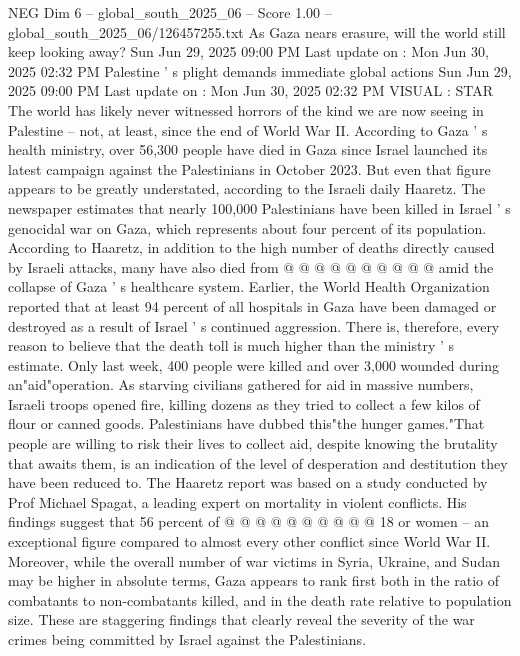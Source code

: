 \begin{textsample}{NEG Dim 6 – global\_south\_2025\_06 – Score 1.00 – global\_south\_2025\_06/126457255.txt}  \label{ex:f6_neg_442}
As Gaza nears erasure, will the world still keep looking away?
Sun Jun 29, 2025 09:00 PM Last update on : Mon Jun 30, 2025 02:32 PM Palestine ' s plight demands immediate global actions Sun Jun 29, 2025 09:00 PM Last update on : Mon Jun 30, 2025 02:32 PM VISUAL : STAR The world has likely never witnessed horrors of the kind we are now seeing in Palestine -- not, at least, since the end of World War II.
According to Gaza ' s health ministry, over 56,300 people have died in Gaza since Israel launched its latest campaign against the Palestinians in October 2023.
But even that figure appears to be greatly understated, according to the Israeli daily Haaretz.
The newspaper estimates that nearly 100,000 Palestinians have been killed in Israel ' s genocidal war on Gaza, which represents about four percent of its population.
According to Haaretz, in addition to the high number of deaths directly caused by Israeli attacks, many have also died from @ @ @ @ @ @ @ @ @ @ amid the collapse of Gaza ' s healthcare system.
Earlier, the World Health Organization reported that at least 94 percent of all hospitals in Gaza have been damaged or destroyed as a result of Israel ' s continued aggression.
There is, therefore, every reason to believe that the death toll is much higher than the ministry ' s estimate.
Only last week, 400 people were killed and over 3,000 wounded during an"aid"operation.
As starving civilians gathered for aid in massive numbers, Israeli troops opened fire, killing dozens as they tried to collect a few kilos of flour or canned goods.
Palestinians have dubbed this"the hunger games."That people are willing to risk their lives to collect aid, despite knowing the brutality that awaits them, is an indication of the level of desperation and destitution they have been reduced to.
The Haaretz report was based on a study conducted by Prof Michael Spagat, a leading expert on mortality in violent conflicts.
His findings suggest that 56 percent of @ @ @ @ @ @ @ @ @ @ 18 or women -- an exceptional figure compared to almost every other conflict since World War II.
Moreover, while the overall number of war victims in Syria, Ukraine, and Sudan may be higher in absolute terms, Gaza appears to rank first both in the ratio of combatants to non-combatants killed, and in the death rate relative to population size.
These are staggering findings that clearly reveal the severity of the war crimes being committed by Israel against the Palestinians.

\end{textsample}
